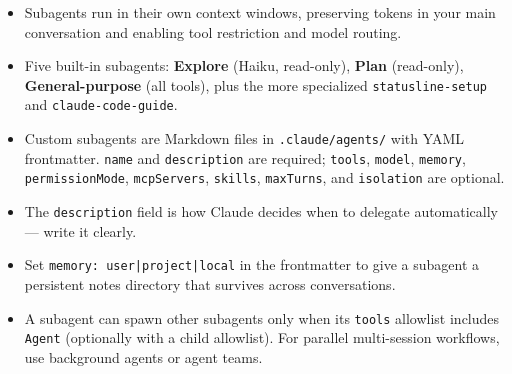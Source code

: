 \begin{summarybox}
\begin{itemize}
  \item Subagents run in their own context windows, preserving tokens in your
        main conversation and enabling tool restriction and model routing.
  \item Five built-in subagents: \textbf{Explore} (Haiku, read-only),
        \textbf{Plan} (read-only), \textbf{General-purpose} (all tools),
        plus the more specialized \texttt{statusline-setup} and
        \texttt{claude-code-guide}.
  \item Custom subagents are Markdown files in \texttt{.claude/agents/} with
        YAML frontmatter. \texttt{name} and \texttt{description} are
        required; \texttt{tools}, \texttt{model}, \texttt{memory},
        \texttt{permissionMode}, \texttt{mcpServers}, \texttt{skills},
        \texttt{maxTurns}, and \texttt{isolation} are optional.
  \item The \texttt{description} field is how Claude decides when to delegate
        automatically — write it clearly.
  \item Set \texttt{memory: user|project|local} in the frontmatter to give
        a subagent a persistent notes directory that survives across
        conversations.
  \item A subagent can spawn other subagents only when its \texttt{tools}
        allowlist includes \texttt{Agent} (optionally with a child allowlist).
        For parallel multi-session workflows, use background agents or
        agent teams.
\end{itemize}
\end{summarybox}

\nocite{*}
\printbibliography[heading=subbibliography,title={References}]
